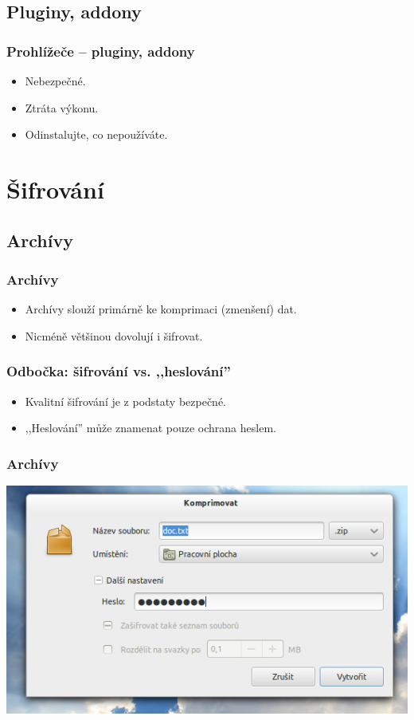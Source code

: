 \documentclass[xetex]{beamer}
\begin{document}
\subsection{Pluginy, addony}

\begin{frame}
	\frametitle{Prohlížeče -- pluginy, addony}
	\begin{itemize} 
   		\item Nebezpečné.
  	 	\item Ztráta výkonu.
  	 	\item Odinstalujte, co nepoužíváte.
	\end{itemize} 
\end{frame}

\section{Šifrování}

\subsection{Archívy}

\begin{frame}
	\frametitle{Archívy} 
	\begin{itemize} 
   		\item Archívy slouží primárně ke komprimaci (zmenšení) dat.
  	 	\item Nicméně většinou dovolují i šifrovat.
	\end{itemize} 
\end{frame}

\begin{frame}
	\frametitle{Odbočka: šifrování vs. ,,heslování''} 
	\begin{itemize} 
   		\item Kvalitní šifrování je z podstaty bezpečné.
   		\item ,,Heslování'' může znamenat pouze ochrana heslem.
	\end{itemize} 
\end{frame}

\begin{frame}
 \frametitle{Archívy} 
\includegraphics[scale=0.6]{pic/zip-pass.png}
\end{frame}
\end{document}
